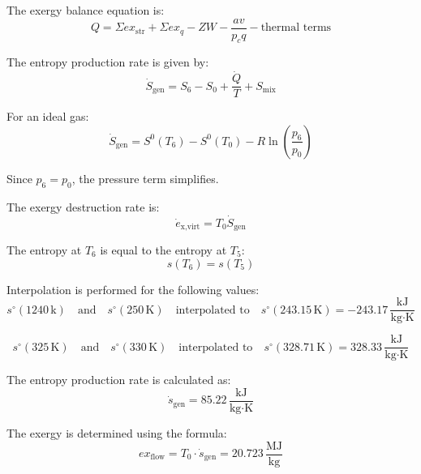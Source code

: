 The exergy balance equation is:  
\[
Q = \Sigma ex_{\text{str}} + \Sigma ex_q - Z W - \frac{av}{p_c q} - \text{thermal terms}
\]  

The entropy production rate is given by:  
\[
\dot{S}_{\text{gen}} = S_6 - S_0 + \frac{\dot{Q}}{T} + S_{\text{mix}}
\]  

For an ideal gas:  
\[
\dot{S}_{\text{gen}} = S^0(T_6) - S^0(T_0) - R \ln \left( \frac{p_6}{p_0} \right)
\]  

Since \( p_6 = p_0 \), the pressure term simplifies.  

The exergy destruction rate is:  
\[
\dot{e}_{\text{x,virt}} = T_0 \dot{S}_{\text{gen}}
\]

The entropy at \( T_6 \) is equal to the entropy at \( T_5 \):  
\[
s(T_6) = s(T_5)
\]

Interpolation is performed for the following values:  
\[
s^\circ(1240 \, \text{k}) \quad \text{and} \quad s^\circ(250 \, \text{K}) \quad \text{interpolated to} \quad s^\circ(243.15 \, \text{K}) = -243.17 \, \frac{\text{kJ}}{\text{kg·K}}
\]

\[
s^\circ(325 \, \text{K}) \quad \text{and} \quad s^\circ(330 \, \text{K}) \quad \text{interpolated to} \quad s^\circ(328.71 \, \text{K}) = 328.33 \, \frac{\text{kJ}}{\text{kg·K}}
\]

The entropy production rate is calculated as:  
\[
\dot{s}_{\text{gen}} = 85.22 \, \frac{\text{kJ}}{\text{kg·K}}
\]

The exergy is determined using the formula:  
\[
ex_{\text{flow}} = T_0 \cdot \dot{s}_{\text{gen}} = 20.723 \, \frac{\text{MJ}}{\text{kg}}
\]